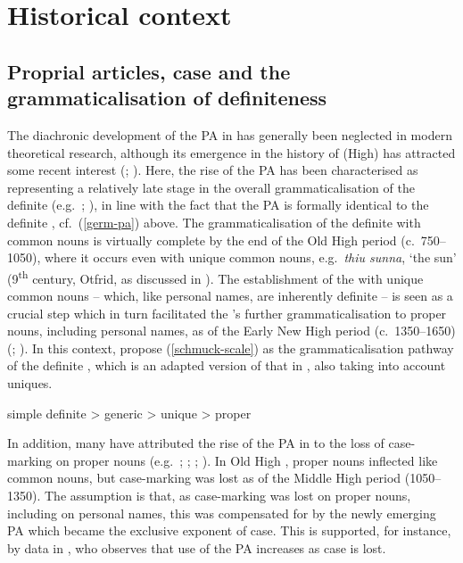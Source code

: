\documentclass[output=paper,colorlinks,citecolor=brown]{langscibook}
\begin{document}
\section{Historical context}\label{sect:hist-context}

\subsection{Proprial articles, case and the grammaticalisation of definiteness}

\begin{sloppypar}
The diachronic development of the PA in  has generally been neglected in modern theoretical research, although its emergence in the history of (High)  has attracted some recent interest (\citealp{Schmuck2014}; \citealp{Schmuck2020-hex,schmuck2020grammaticalisation,schmuck2020rise}). 
Here, the rise of the PA has been characterised as representing a relatively late stage in the overall grammaticalisation of the definite  (e.g.~\citealp{Schmuck2014}; \citealp{schmuck2020grammaticalisation}), in line with the fact that the  PA is formally identical to the definite , cf.~(\ref{germ-pa}) above. The grammaticalisation of the definite  with common nouns is virtually complete by the end of the Old High  period (c.~750--1050), where it occurs even with unique common nouns, e.g.~\textit{thiu sunna}, `the sun' (9\textsuperscript{th} century, Otfrid, as discussed in \citealp[103]{Schmuck2014}). The establishment of the  with unique common nouns -- which, like personal names, are inherently definite -- is seen as a crucial step which in turn facilitated the 's further grammaticalisation to proper nouns, including personal names, as of the Early New High  period (c.~1350--1650) (\citealp{Schmuck2014}; \citealp{schmuck2020grammaticalisation}). In this context, \citet{Schmuck2014} propose  (\ref{schmuck-scale}) as the grammaticalisation pathway of the definite , which is an adapted version of that in \citet[337]{lyons1999definiteness}, also taking into account uniques.
\end{sloppypar}

\ea \label{schmuck-scale} simple definite > generic > unique > proper 
\z 

In addition, many have attributed the rise of the PA in  to the loss of case-marking on proper nouns (e.g.~\citealp[52--55]{behaghel1923deutsche}; \citealp{Schmuck2014}; \citealp{ackermann2018grammatik}; \citealp{schmuck2020rise}). In Old High , proper nouns inflected like common nouns, but case-marking was lost as of the Middle High  period (1050--1350). The assumption is that, as case-marking was lost on proper nouns, including on personal names, this was compensated for by the newly emerging PA which became the exclusive exponent of case. This is supported, for instance, by data in \citet[153--154, 188--189]{ackermann2018grammatik}, who observes that use of the PA increases as case  is lost.\largerpage
\end{document}
